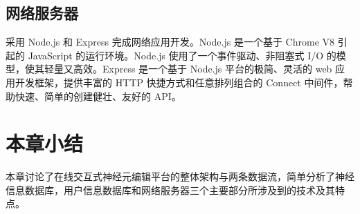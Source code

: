 \subsection{网络服务器}
采用 Node.js 和 Express 完成网络应用开发。Node.js 是一个基于 Chrome V8 引起的 JavaScript 的运行环境。Node.js 使用了一个事件驱动、非阻塞式 I/O 的模型，使其轻量又高效。Express 是一个基于 Node.js 平台的极简、灵活的 web 应用开发框架，提供丰富的 HTTP 快捷方式和任意排列组合的 Connect 中间件，帮助快速、简单的创建健壮、友好的 API。

\section{本章小结}
本章讨论了在线交互式神经元编辑平台的整体架构与两条数据流，简单分析了神经信息数据库，用户信息数据库和网络服务器三个主要部分所涉及到的技术及其特点。
